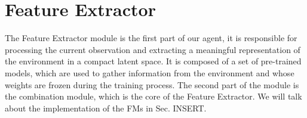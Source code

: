 







\section{Feature Extractor} \label{sec:feature_extractor}
The Feature Extractor module is the first part of our agent, it is responsible for processing the current observation and extracting a meaningful representation of the environment in a compact latent space.
It is composed of a set of pre-trained models, which are used to gather information from the environment and whose weights are frozen during the training process.
The second part of the module is the combination module, which is the core of the Feature Extractor.
We will talk about the implementation of the FMs in Sec. INSERT.

